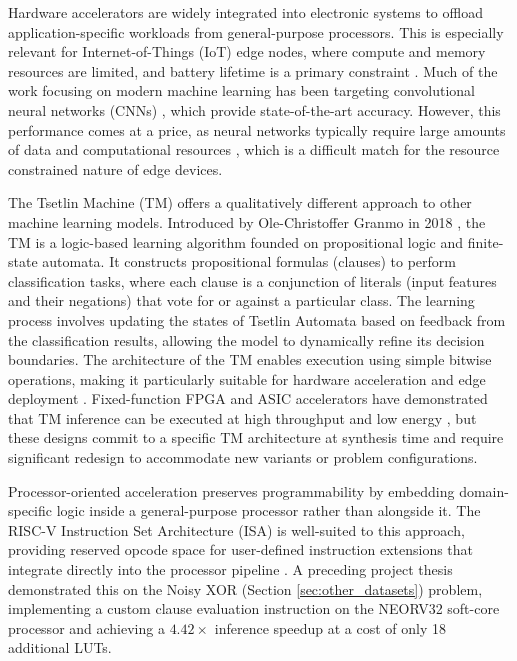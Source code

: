 
Hardware accelerators are widely integrated into electronic systems to offload application-specific workloads from general-purpose processors. This is especially relevant for Internet-of-Things (IoT) edge nodes, where compute and memory resources are limited, and battery lifetime is a primary constraint \cite{9985008}. Much of the work focusing on modern machine learning has been targeting convolutional neural networks (CNNs) \cite{Lecun2015436}, which provide state-of-the-art accuracy. However, this performance comes at a price, as neural networks typically require large amounts of data and computational resources \cite{GranmoOle-Christoffer2018TTM-}, which is a difficult match for the resource constrained nature of edge devices. 


The Tsetlin Machine (TM) offers a qualitatively different approach to other machine learning models. Introduced by Ole-Christoffer Granmo in 2018 \cite{GranmoOle-Christoffer2018TTM-}, the TM is a logic-based learning algorithm founded on propositional logic and finite-state automata. It constructs propositional formulas (clauses) to perform classification tasks, where each clause is a conjunction of literals (input features and their negations) that vote for or against a particular class. The learning process involves updating the states of Tsetlin Automata based on feedback from the classification results, allowing the model to dynamically refine its decision boundaries. The architecture of the TM enables execution using simple bitwise operations, making it particularly suitable for hardware acceleration and edge deployment \cite{AndersTunheimSvein2025AA86, TunheimSveinAnders2023CTMT, TunheimSveinAnders2025TMIC}. Fixed-function FPGA and ASIC accelerators have demonstrated that TM inference can be executed at high throughput and low energy \cite{AndersTunheimSvein2025AA86, TunheimSveinAnders2023CTMT, TunheimSveinAnders2025TMIC}, but these designs commit to a specific TM architecture at synthesis time and require significant redesign to accommodate new variants or problem configurations.

Processor-oriented acceleration preserves programmability by embedding domain-specific logic inside a general-purpose processor rather than alongside it. The RISC-V Instruction Set Architecture (ISA) is well-suited to this approach, providing reserved opcode space for user-defined instruction extensions that integrate directly into the processor pipeline \cite{WatermanLee2011,riscv_unpriv_isa}. A preceding project thesis \cite{JB2025} demonstrated this on the Noisy XOR (Section \ref{sec:other_datasets}) problem, implementing a custom clause evaluation instruction on the NEORV32 soft-core processor and achieving a $4.42\times$ inference speedup at a cost of only 18 additional LUTs. 

